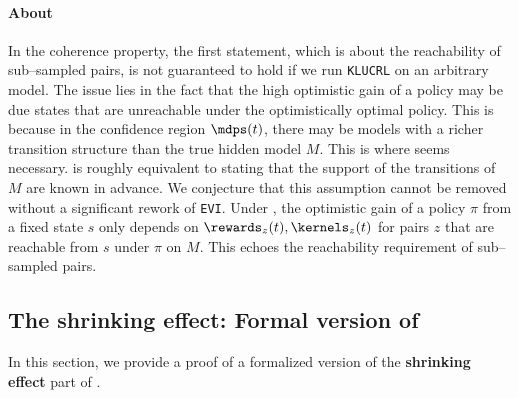 \documentclass[preprint,cleveref,12pt]{colt2025}
\def\models{\mdps}
\newcommand{\strong}[1]{\textbf{#1}}
\begin{document}
    \paragraph{About }
    In the coherence property, the first statement, which is about the reachability of sub--sampled pairs, is not guaranteed to hold if we run \texttt{KLUCRL} on an arbitrary model.
    The issue lies in the fact that the high optimistic gain of a policy may be due states that are unreachable under the optimistically optimal policy.
    This is because in the confidence region $\models(t)$, there may be models with a richer transition structure than the true hidden model $M$. 
    This is where  seems necessary.
     is roughly equivalent to stating that the support of the transitions of $M$ are known in advance. 
    We conjecture that this assumption cannot be removed without a significant rework of \texttt{EVI}.
    Under , the optimistic gain of a policy $\pi$ from a fixed state $s$ only depends on $\rewards_z(t), \kernels_z(t)$ for pairs $z$ that are reachable from $s$ under $\pi$ on $M$.
    This echoes the reachability requirement of sub--sampled pairs.

    \subsection{The shrinking effect: Formal version of }
    \label{appendix_shrinking}

    In this section, we provide a proof of a formalized version of the \strong{shrinking effect} part of .
\end{document}
